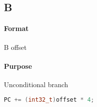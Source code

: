 \subsection{B}


\paragraph{Format} B offset

\paragraph{Purpose} Unconditional branch

\begin{lstlisting}[language=c]
    PC += (int32_t)offset * 4;
\end{lstlisting}
